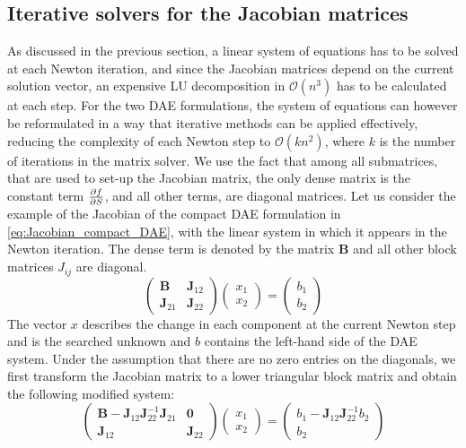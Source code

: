 \subsection{Iterative solvers for the Jacobian matrices}
\label{ssec:iterative_solver_Jacobian}
As discussed in the previous section, a linear system of equations has to be solved at each Newton iteration, and since the Jacobian matrices depend on the current solution vector, an expensive LU decomposition in $\mathcal{O}\left(n^3\right)$ has to be calculated at each step. For the two DAE formulations, the system of equations can however be reformulated in a way that iterative methods can be applied effectively, reducing the complexity of each Newton step to $\mathcal{O}\left(kn^2\right)$, where $k$ is the number of iterations in the matrix solver. We use the fact that among all submatrices, that are used to set-up the Jacobian matrix, the only dense matrix is the constant term $\pdv{f}{S}$, and all other terms, are diagonal matrices. Let us consider the example of the Jacobian of the compact DAE formulation in \autoref{eq:Jacobian_compact_DAE}, with the linear system in which it appears in the Newton iteration. The dense term is denoted by the matrix $\mathbf{B}$ and all other block matrices $J_{ij}$ are diagonal.
\begin{equation}
	\begin{pmatrix}
		\mathbf{B} & \mathbf{J}_{12} \\ 
		\mathbf{J}_{21} & \mathbf{J}_{22} 
	\end{pmatrix} \begin{pmatrix}
		x_1 \\ x_2
	\end{pmatrix} = \begin{pmatrix}
		b_1 \\ b_2
	\end{pmatrix} 
\end{equation}
The vector $x$ describes the change in each component at the current Newton step and is the searched unknown and $b$ contains the left-hand side of the DAE system. Under the assumption that there are no zero entries on the diagonals, we first transform the Jacobian matrix to a lower triangular block matrix and obtain the following modified system: 
\begin{equation}
	\begin{pmatrix}
		\mathbf{B} - \mathbf{J}_{12}\mathbf{J}_{22}^{-1}\mathbf{J}_{21} & \mathbf{0} \\ 
		\mathbf{J}_{12} & \mathbf{J}_{22} 
	\end{pmatrix} \begin{pmatrix}
		x_1 \\ x_2
	\end{pmatrix} = \begin{pmatrix}
		b_1 - \mathbf{J}_{12}\mathbf{J}_{22}^{-1}b_2 \\ b_2
	\end{pmatrix} 
\end{equation}
